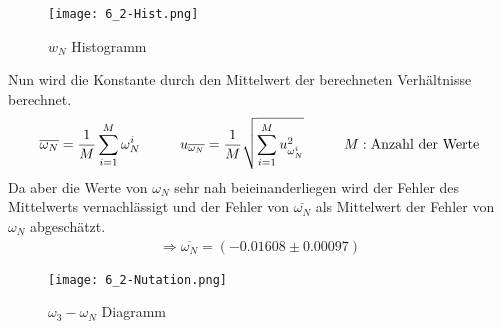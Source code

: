 \begin{figure}[ht]
    \centering
    \caption{$w_N$ Histogramm}
    \texttt{[image: 6\_2-Hist.png]}
\end{figure}
Nun wird die Konstante durch den Mittelwert der berechneten Verhältnisse berechnet.
\begin{align}   
    \overline{\omega_N} = \frac{1}{M}\sum_{i=1}^{M}\omega_N^i \tab u_{\overline{\omega_N}}= \frac{1}{M}\sqrt{\sum_{i=1}^{M}u_{\omega_N^i}^2} \tab M:\text{Anzahl der Werte}
\end{align}
Da aber die Werte von $\omega_N$ sehr nah beieinanderliegen wird der Fehler des Mittelwerts vernachlässigt und der Fehler von $\overline{\omega_N}$ als Mittelwert der Fehler von $\omega_N$ abgeschätzt.
\begin{align*}
    \Rightarrow\boxed{\overline{\omega_N}=(-0.01608\pm0.00097)}
\end{align*}
\newpage
\begin{figure}[ht]
    \centering
    \caption{$\omega_3-\omega_N$ Diagramm}
    \texttt{[image: 6\_2-Nutation.png]}
\end{figure}